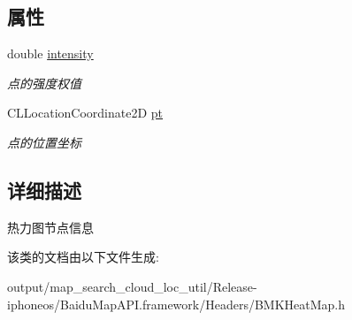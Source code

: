 \subsection*{属性}
\begin{DoxyCompactItemize}
\item 
\hypertarget{interface_b_m_k_heat_map_node_ac1ab14f83204a0e5f4a16180acc30742}{}double \hyperlink{interface_b_m_k_heat_map_node_ac1ab14f83204a0e5f4a16180acc30742}{intensity}\label{interface_b_m_k_heat_map_node_ac1ab14f83204a0e5f4a16180acc30742}

\begin{DoxyCompactList}\small\item\em 点的强度权值 \end{DoxyCompactList}\item 
\hypertarget{interface_b_m_k_heat_map_node_a7dcd370e65e376d8253e9a9d127dc984}{}C\+L\+Location\+Coordinate2\+D \hyperlink{interface_b_m_k_heat_map_node_a7dcd370e65e376d8253e9a9d127dc984}{pt}\label{interface_b_m_k_heat_map_node_a7dcd370e65e376d8253e9a9d127dc984}

\begin{DoxyCompactList}\small\item\em 点的位置坐标 \end{DoxyCompactList}\end{DoxyCompactItemize}


\subsection{详细描述}
热力图节点信息 

该类的文档由以下文件生成\+:\begin{DoxyCompactItemize}
\item 
output/map\+\_\+search\+\_\+cloud\+\_\+loc\+\_\+util/\+Release-\/iphoneos/\+Baidu\+Map\+A\+P\+I.\+framework/\+Headers/B\+M\+K\+Heat\+Map.\+h\end{DoxyCompactItemize}
